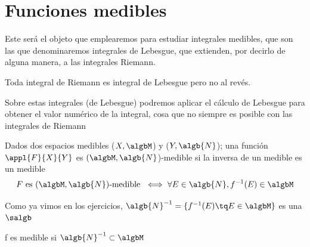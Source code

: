 \documentclass{apuntes}
\begin{document}
\chapter{Funciones medibles}
Este será el objeto que emplearemos para estudiar integrales medibles, que son las que denominaremos integrales de Lebesgue, que extienden, por decirlo de alguna manera, a las integrales Riemann.

Toda integral de Riemann es integral de Lebesgue pero no al revés.

Sobre estas integrales (de Lebesgue) podremos aplicar el cálculo de Lebesgue para obtener el valor numérico de la integral, cosa que no siempre es posible con las integrales de Riemann

\begin{defn}
Dados dos espacios medibles ($X, \algbM$) y ($Y, \algb{N}$); una función $\appl{F}{X}{Y}$ es $(\algbM,\algb{N}$)-medible si la inversa de un medible es un medible
\[F \text{ es }  (\algbM,\algb{N})\text{-medible } \iff \forall E \in \algb{N}, f^{-1}(E)\in \algbM\]
\end{defn}

Como ya vimos en los ejercicios, $\algb{N}^{-1}=\{f^{-1}(E) \tq E \in \algbM\}$ es una $\salgb$

\obs f es medible si $\algb{N}^{-1} \subset \algbM$
\end{document}
